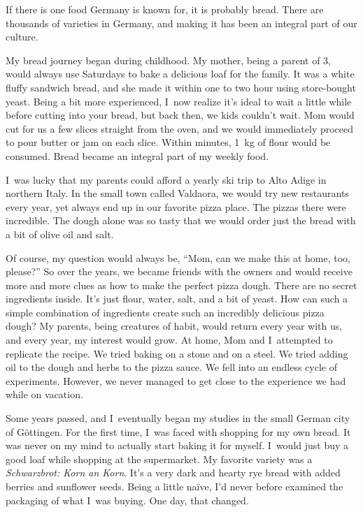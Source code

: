 If there is one food Germany is known for, it is probably bread.
There are thousands of varieties in Germany,
and making it has been an integral part of our culture.

My bread journey began during childhood. My mother, being a parent
of 3, would always use Saturdays to bake a delicious loaf for the family.
It was a white fluffy sandwich bread, and she made it within one to two hour using store-bought yeast.
Being a bit more experienced, I~now realize it's
ideal to wait a little while before cutting into your bread, but back then,
we kids couldn't wait. Mom would cut for us a few slices straight from the oven, and we would
immediately proceed to pour butter or jam on each slice. Within minutes,
\qty{1}{\kg} of flour would be consumed. Bread became an integral part of my
weekly food.

I~was lucky that my parents could afford a yearly ski trip to
Alto Adige in northern Italy. In the small town called Valdaora, we
would try new restaurants every year, yet always end up in our favorite
pizza place. The pizzas there were incredible. The dough
alone was so tasty that we would order just the bread with a
bit of olive oil and salt.

Of course, my question would always be, ``Mom, can we make this at home, too, please?''
So over the years, we became friends with the owners and would receive
more and more clues as how to make the perfect pizza dough. There
are no secret ingredients inside. It's just flour, water, salt, and a bit of yeast.
How can such a simple combination of ingredients create such an incredibly delicious
pizza dough? My parents, being creatures of habit, would return every year with us,
and every year, my interest would grow. At home, Mom and I~attempted to replicate
the recipe. We tried baking on a stone and on a steel. We tried adding oil to the dough and herbs
to the pizza sauce. We fell into an endless cycle of experiments. However, we never managed
to get close to the experience we had while on vacation.

Some years passed, and I~eventually began my studies in the small German city of Göttingen.
For the first time, I~was faced with shopping for my own bread. It was never
on my mind to actually start baking it for myself. I~would just buy 
a good loaf while shopping at the supermarket. My favorite variety
was a \emph{Schwarzbrot: Korn an Korn}. It’s a very dark and hearty rye bread
with added berries and sunflower seeds. Being a little naïve,
I'd never before examined the packaging of what I~was buying. One day, that
changed.

